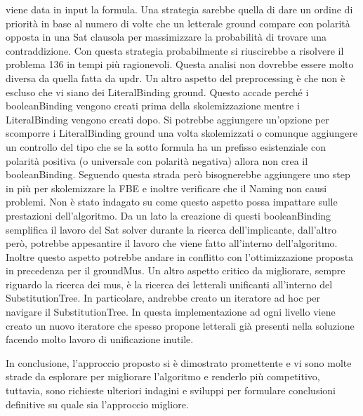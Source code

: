 \documentclass[./main.tex]{subfiles}
\begin{document}
viene data in input la formula. 
Una strategia sarebbe quella di dare un ordine di priorità in base al numero di volte che un letterale ground compare
con polarità opposta in una Sat clausola per massimizzare la probabilità di trovare una contraddizione.
Con questa strategia probabilmente si riuscirebbe a risolvere il problema 136 in tempi più ragionevoli.
Questa analisi non dovrebbe essere molto diversa da quella fatta da updr.
Un altro aspetto del preprocessing è che non è escluso che vi siano dei LiteralBinding ground.
Questo accade perché i booleanBinding vengono creati prima della skolemizzazione mentre i LiteralBinding vengono creati dopo.
Si potrebbe aggiungere un'opzione per scomporre i LiteralBinding ground una volta skolemizzati 
o comunque aggiungere un controllo del tipo che se la sotto formula ha un prefisso esistenziale con polarità positiva (o universale con polarità negativa) allora non crea il booleanBinding.
Seguendo questa strada però bisognerebbe aggiungere uno step in più per skolemizzare la FBE e 
inoltre verificare che il Naming non causi problemi.
Non è stato indagato su come questo aspetto possa impattare sulle prestazioni dell'algoritmo.
Da un lato la creazione di questi booleanBinding semplifica il lavoro del Sat solver durante la ricerca dell'implicante,
dall'altro però, potrebbe appesantire il lavoro che viene fatto all'interno dell'algoritmo.
Inoltre questo aspetto potrebbe andare in conflitto con l'ottimizzazione proposta in precedenza per il groundMus.
Un altro aspetto critico da migliorare, sempre riguardo la ricerca dei mus, è la ricerca dei letterali unificanti all'interno del SubstitutionTree.
In particolare, andrebbe creato un iteratore ad hoc per navigare il SubstitutionTree.
In questa implementazione ad ogni livello viene creato un nuovo iteratore che spesso propone letterali già presenti nella soluzione
facendo molto lavoro di unificazione inutile.

In conclusione, l'approccio proposto si è dimostrato promettente e vi sono molte strade da esplorare 
per migliorare l'algoritmo e renderlo più competitivo, 
tuttavia, sono richieste ulteriori indagini e sviluppi per formulare conclusioni definitive su quale sia l'approccio migliore.
\end{document}
